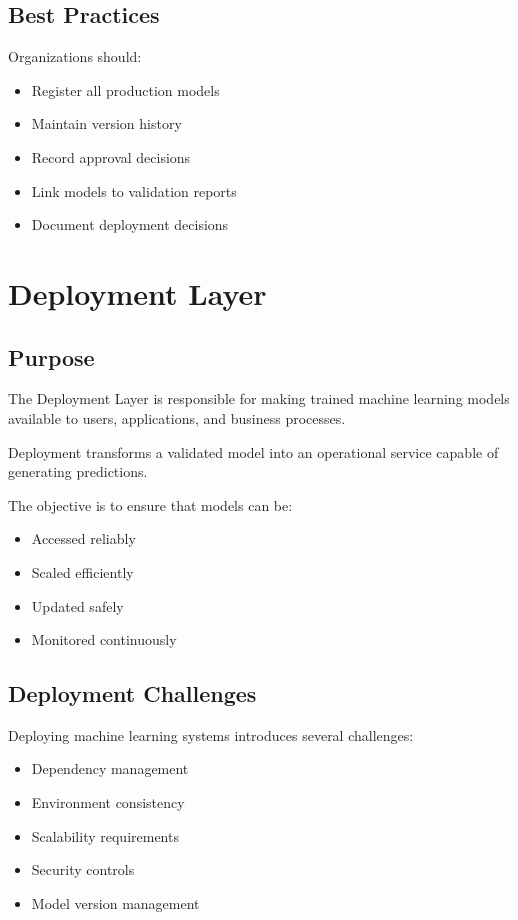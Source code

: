 \subsection{Best Practices}

Organizations should:

\begin{itemize}
    \item Register all production models
    \item Maintain version history
    \item Record approval decisions
    \item Link models to validation reports
    \item Document deployment decisions
\end{itemize}

\section{Deployment Layer}

\subsection{Purpose}

The Deployment Layer is responsible for making trained machine learning models available to users, applications, and business processes.

Deployment transforms a validated model into an operational service capable of generating predictions.

The objective is to ensure that models can be:

\begin{itemize}
    \item Accessed reliably
    \item Scaled efficiently
    \item Updated safely
    \item Monitored continuously
\end{itemize}

\subsection{Deployment Challenges}

Deploying machine learning systems introduces several challenges:

\begin{itemize}
    \item Dependency management
    \item Environment consistency
    \item Scalability requirements
    \item Security controls
    \item Model version management
\end{itemize}

